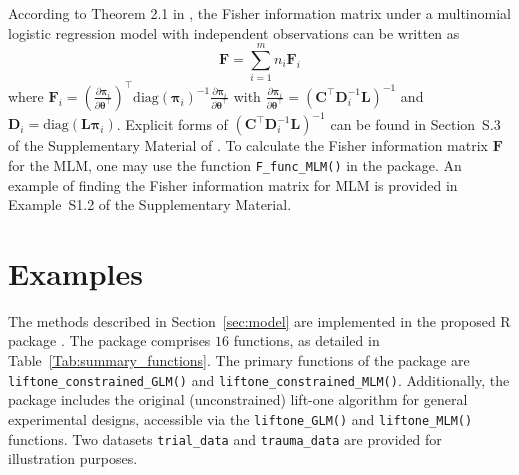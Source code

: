According to Theorem 2.1 in \cite{bu2020}, the Fisher information matrix under a multinomial logistic regression model with independent observations can be written as
\begin{equation}\label{eq:F_sum}
  \mathbf F = \sum_{i=1}^m n_i \mathbf F_i
\end{equation}
where $\mathbf F_i = (\frac{\partial{\boldsymbol\pi_i}}{\partial{\boldsymbol \theta^\top}})^\top \text{diag}(\boldsymbol \pi_i)^{-1}\frac{\partial \boldsymbol \pi_i}{\partial \boldsymbol \theta^\top}$ with $\frac{\partial \boldsymbol \pi_i}{\partial \boldsymbol \theta^\top} = (\mathbf C^\top \mathbf D_i^{-1} \mathbf L)^{-1}$ and $\mathbf D_i = \text{diag}(\mathbf L \boldsymbol \pi_i)$. Explicit forms of $(\mathbf C^\top \mathbf D_i^{-1} \mathbf L)^{-1}$ can be found in  Section~S.3 of the Supplementary Material of \cite{bu2020}. To calculate the Fisher information matrix $\mathbf F$ for the MLM, one may use the function \texttt{F\_func\_MLM()} in the  package. An example of finding the Fisher information matrix for MLM is provided in Example~S1.2 of the Supplementary Material.

\section{Examples}\label{sec:example}

The methods described in Section~\ref{sec:model} are implemented in the proposed R package . The  package comprises $16$ functions, as detailed in Table~\ref{Tab:summary_functions}. The primary functions of the  package are \texttt{liftone\_constrained\_GLM()} and \texttt{liftone\_constrained\_MLM()}. Additionally, the package includes the original (unconstrained) lift-one algorithm for general experimental designs, accessible via the \texttt{liftone\_GLM()} and \texttt{liftone\_MLM()} functions. Two datasets \texttt{trial\_data} and \texttt{trauma\_data} are provided for illustration purposes.

